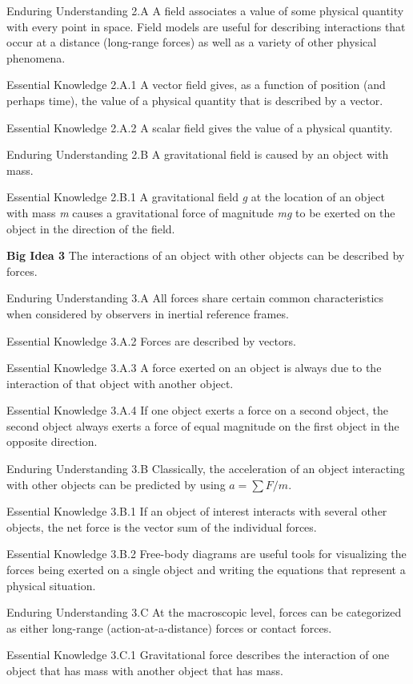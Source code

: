 \documentclass[
]{book}
\begin{document}
Enduring Understanding 2.A A field associates a value of some physical
quantity with every point in space. Field models are useful for
describing interactions that occur at a distance (long-range forces) as
well as a variety of other physical phenomena.

Essential Knowledge 2.A.1 A vector field gives, as a function of
position (and perhaps time), the value of a physical quantity that is
described by a vector.

Essential Knowledge 2.A.2 A scalar field gives the value of a physical
quantity.

Enduring Understanding 2.B A gravitational field is caused by an object
with mass.

Essential Knowledge 2.B.1 A gravitational field \emph{g} at the location of
an object with mass \emph{m} causes a gravitational force of magnitude \emph{mg}
to be exerted on the object in the direction of the field.

\textbf{Big Idea 3} The interactions of an object with other objects can be
described by forces.

Enduring Understanding 3.A All forces share certain common
characteristics when considered by observers in inertial reference
frames.

Essential Knowledge 3.A.2 Forces are described by vectors.

Essential Knowledge 3.A.3 A force exerted on an object is always due to
the interaction of that object with another object.

Essential Knowledge 3.A.4 If one object exerts a force on a second
object, the second object always exerts a force of equal magnitude on
the first object in the opposite direction.

Enduring Understanding 3.B Classically, the acceleration of an object
interacting with other objects can be predicted by using
\(a = {\sum{F/m}}\).

Essential Knowledge 3.B.1 If an object of interest interacts with
several other objects, the net force is the vector sum of the individual
forces.

Essential Knowledge 3.B.2 Free-body diagrams are useful tools for
visualizing the forces being exerted on a single object and writing the
equations that represent a physical situation.

Enduring Understanding 3.C At the macroscopic level, forces can be
categorized as either long-range (action-at-a-distance) forces or
contact forces.

Essential Knowledge 3.C.1 Gravitational force describes the interaction
of one object that has mass with another object that has mass.
\end{document}
